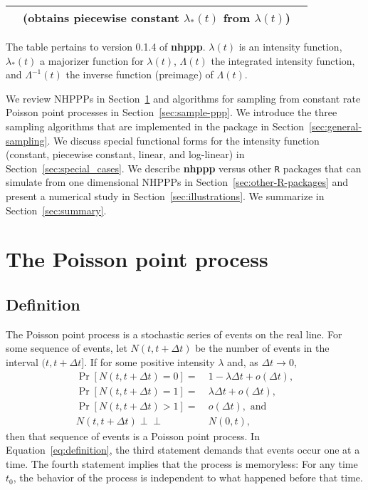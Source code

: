 \documentclass[10pt,letterpaper]{article}
\newcommand{\pkg}[1]{{\bf #1}}
\newcommand{\proglang}[1]{\texttt{#1}}
\newcommand{\indep}{\perp \!\!\! \perp}
\begin{document}
\begin{table}[ht!]
\begin{adjustwidth}{-2.25in}{0in}
\begin{tabular}{@{}lll@{}}
& (obtains piecewise constant $\lambda_*(t)$ from $\lambda(t)$)                                             
\\ \bottomrule
\end{tabular}%
\begin{flushleft}
The table pertains to version 0.1.4 of \pkg{nhppp}. $\lambda(t)$ is an intensity function, 
$\lambda_*(t)$ a majorizer function for $\lambda(t)$, $\Lambda(t)$ the integrated intensity function, and $\Lambda^{-1}(t)$ the inverse function (preimage) of $\Lambda(t)$.
\end{flushleft}
\end{adjustwidth}
\end{table}


We review NHPPPs in Section~\ref{sec:review} and algorithms for sampling from constant rate Poisson point processes in Section~\ref{sec:sample-ppp}. We introduce the three sampling algorithms that are implemented in the package in Section~\ref{sec:general-sampling}. We discuss special functional forms for the intensity function (constant, piecewise constant, linear, and log-linear) in Section~\ref{sec:special_cases}. We describe \pkg{nhppp} versus other \proglang{R} packages that can simulate from one dimensional NHPPPs in Section~\ref{sec:other-R-packages} and present a numerical study in Section~\ref{sec:illustrations}. We summarize in Section~\ref{sec:summary}.

\section{The Poisson point process} \label{sec:review}
\subsection{Definition}
The Poisson point process is a stochastic series of events on the real line. For some sequence of events, let $N(t, t + \Delta t)$ be the number of events in the interval $(t, t  + \Delta t]$. If for some positive intensity $\lambda$ and, as ${\Delta t \rightarrow 0}$,
\begin{equation}\label{eq:definition}
    \begin{aligned}
    \Pr[N(t, t + \Delta t) = 0] =&\  1 - \lambda \Delta t +  o(\Delta t), \\
    \Pr[N(t, t + \Delta t) = 1] =&\  \lambda \Delta t +  o(\Delta t), \\
    \Pr[N(t, t + \Delta t) >1] =&\  o(\Delta t),\text{ and } \\
    N(t, t + \Delta t) \indep&\ N(0, t),
    \end{aligned}
\end{equation}
then that sequence of events is a Poisson point process. In Equation~\eqref{eq:definition}, the third statement demands that events occur one at a time. The fourth statement implies that the process is memoryless: For any time $t_0$, the behavior of the process is independent to what happened before that time.
\end{document}

